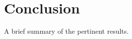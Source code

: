 \documentclass[12pt,letterpaper]{article}       %
\begin{document}
\section{Conclusion}

A brief summary of the pertinent results.



\end{document}
